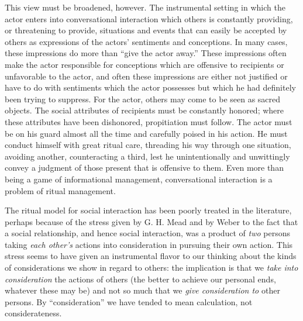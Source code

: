 \documentclass[twoside,symmetric,nobib,justified]{tufte-book}
\begin{document}
This view must be broadened, however. The instrumental setting in which
the actor enters into conversational interaction which others is
constantly providing, or threatening to provide, situations and events
that can easily be accepted by others as expressions of the actors'
sentiments and conceptions. In many cases, these impressions do more
than ``give the actor away.'' These impressions often make the actor
responsible for conceptions which are offensive to recipients or
unfavorable to the actor, and often these impressions are either not
justified or have to do with sentiments which the actor possesses but
which he had definitely been trying to suppress. For the actor, others
may come to be seen as sacred objects. The social attributes of
recipients must be constantly honored; where these attributes have been
dishonored, propitiation must follow. The actor must be on his guard
almost all the time and carefully poised in his action. He must conduct
himself with great ritual care, threading his way through one situation,
avoiding another, counteracting a third, lest he unintentionally and
unwittingly convey a judgment of those present that is offensive to
them. Even more than being a game of informational management,
conversational interaction is a problem of ritual management.

The ritual model for social interaction has been poorly treated in the
literature, perhaps because of the stress given by G. H. Mead and by
Weber to the fact that a social relationship, and hence social
interaction, was a product of \emph{two} persons taking \emph{each
other's} actions into consideration in pursuing their own action. This
stress seems to have given an instrumental flavor to our thinking about
the kinds of considerations we show in regard to others: the implication
is that we \emph{take into consideration} the actions of others (the
better to achieve our personal ends, whatever these may be) and not so
much that we \emph{give consideration to} other persons. By
``consideration'' we have tended to mean calculation, not
considerateness.
\end{document}
